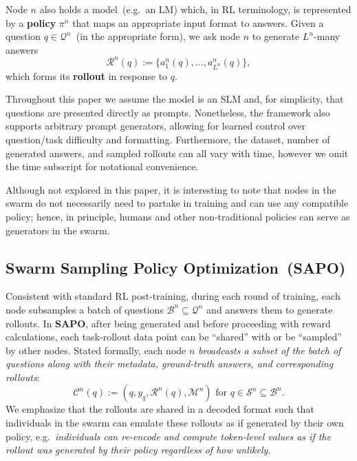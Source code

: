\documentclass[11pt, a4paper, logo, singlecolumn, copyright]{gensyn}
\newcommand{\SAPO}{\textbf{SAPO}}
\begin{document}
Node $n$ also holds a model~(e.g.~an LM) which, in RL terminology, is represented by a \textbf{policy} $\pi^n$ that maps an appropriate input format to answers. Given a question $q\in\mathcal{Q}^n$~(in the appropriate form), we ask node $n$ to generate $L^n$-many answers $$\mathcal{R}^n(q) := \{a^n_1(q),\dots,a^n_{L^n}(q)\},$$
which forms its \textbf{rollout} in response to $q$.

Throughout this paper we assume the model is an SLM and, for simplicity, that questions are presented directly as prompts. Nonetheless, the framework also supports arbitrary prompt generators, allowing for learned control over question/task difficulty and formatting. Furthermore, the dataset, number of generated answers, and sampled rollouts can all vary with time, however we omit the time subscript for notational convenience.

Although not explored in this paper, it is interesting to note that nodes in the swarm do not necessarily need to partake in training and can use any compatible policy; hence, in principle, humans and other non-traditional policies can serve as generators in the swarm.

\subsection{Swarm Sampling Policy Optimization~(SAPO)}\label{subsec:sapo}

Consistent with standard RL post-training, during each round of training, each node subsamples a batch of questions $\mathcal{B}^n\subseteq \mathcal{Q}^n$ and answers them to generate rollouts. In \SAPO, after being generated and before proceeding with reward calculations, each task-rollout data point can be ``shared'' with or be ``sampled'' by other nodes. Stated formally, each node $n$ \textit{broadcasts a subset of the batch of questions along with their metadata, ground-truth answers, and corresponding rollouts}:
$$\mathcal{C}^n(q) := (q,y_q,\mathcal{R}^n(q),\mathcal{M}^n)\text{~for~}q\in\mathcal{S}^n\subseteq \mathcal{B}^n.$$
We emphasize that the rollouts are shared in a decoded format such that individuals in the swarm can emulate these rollouts as if generated by their own policy, e.g.~\textit{individuals can re-encode and compute token-level values as if the rollout was generated by their policy regardless of how unlikely.}
\end{document}
